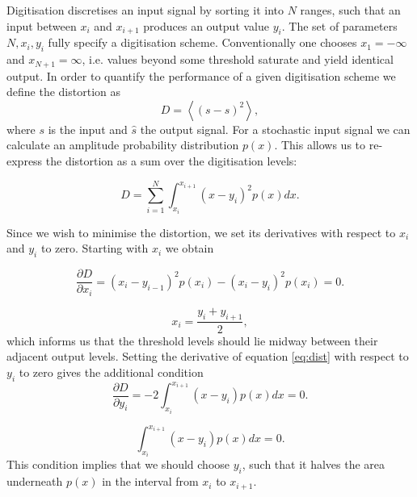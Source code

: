 \documentclass[a4paper,fleqn,usenatbib]{mnras}
\begin{document}
Digitisation discretises an input signal by sorting it into $N$ ranges, such that an input between $x_i$ and $x_{i+1}$ produces an output value $y_i$. The set of parameters $N, x_i, y_i$ fully specify a digitisation scheme. Conventionally one chooses $x_{1} = -\infty$ and $x_{N+1} = \infty$, i.e. values beyond some threshold saturate and yield identical output. In order to quantify the performance of a given digitisation scheme we define the distortion as
\begin{equation}\label{eq:distdef}
D = \left\langle  \left( s - \hat{s} \right)^2 \right\rangle,
\end{equation}
where $s$ is the input and $\hat{s}$ the output signal. For a stochastic input signal we can calculate an amplitude probability distribution $p(x)$. This allows us to re-express the distortion as a sum over the digitisation levels:

\begin{equation} \label{eq:dist}
D = \sum_{i = 1}^N \int_{x_i}^{x_{i+1}} \left(x-y_i\right)^2 p(x) dx.
\end{equation}

Since we wish to minimise the distortion, we set its derivatives with respect to $x_i$ and $y_i$ to zero. Starting with $x_i$ we obtain

\begin{equation} \label{eq:distderiv1}
\frac{\partial D}{\partial x_i} = \left(x_i-y_{i-1}\right)^2 p(x_i) - \left(x_i - y_i\right)^2 p(x_i) = 0.
\end{equation}

\begin{equation} \label{eq:digitequalspacecondition}
x_i = \frac{y_i+y_{i+1}}{2},
\end{equation}
which informs us that the threshold levels should lie midway between their adjacent output levels. Setting the derivative of equation \ref{eq:dist} with respect to $y_i$  to zero gives the additional condition
\begin{equation} \label{eq:distderiv2}
\frac{\partial D}{\partial y_i} = -2 \int_{x_i}^{x_{i+1}} \left( x-y_i \right) p(x) dx = 0.
\end{equation}

\begin{equation} \label{eq:digitareacondition}
\int_{x_i}^{x_{i+1}} \left( x-y_i \right) p(x) dx = 0.
\end{equation}
This condition implies that we should choose $y_i$, such that it halves the area underneath $p(x)$ in the interval from $x_i$ to $x_{i+1}$.
\end{document}
